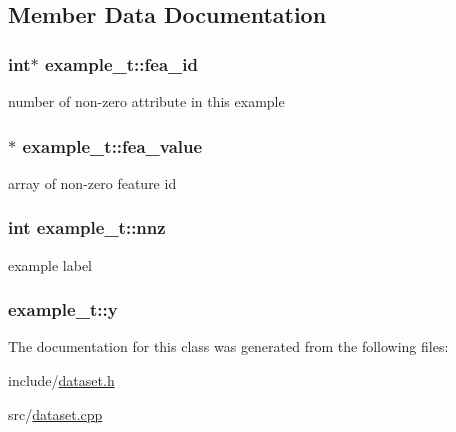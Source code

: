 \subsection{Member Data Documentation}
\hypertarget{classexample__t_a48940c5caff1e78969f1e2c2e7049532}{
\subsubsection[{fea\+\_\+id}]{\setlength{\rightskip}{0pt plus 5cm}int$\ast$ example\+\_\+t\+::fea\+\_\+id}}\label{classexample__t_a48940c5caff1e78969f1e2c2e7049532}
number of non-\/zero attribute in this example \hypertarget{classexample__t_acac894d54d087a9a5f27f063003d5b72}{
\subsubsection[{fea\+\_\+value}]{$\ast$ example\+\_\+t\+::fea\+\_\+value}}\label{classexample__t_acac894d54d087a9a5f27f063003d5b72}
array of non-\/zero feature id \hypertarget{classexample__t_a6501a26509c4d186310a5f51c7a9ddf8}{
\subsubsection[{nnz}]{\setlength{\rightskip}{0pt plus 5cm}int example\+\_\+t\+::nnz}}\label{classexample__t_a6501a26509c4d186310a5f51c7a9ddf8}
example label \hypertarget{classexample__t_a71bd4c6e68d5eb4543b84c47599e72bb}{
\subsubsection[{y}]{ example\+\_\+t\+::y}}\label{classexample__t_a71bd4c6e68d5eb4543b84c47599e72bb}


The documentation for this class was generated from the following files\+:\begin{DoxyCompactItemize}
\item 
include/\hyperlink{dataset_8h}{dataset.\+h}\item 
src/\hyperlink{dataset_8cpp}{dataset.\+cpp}\end{DoxyCompactItemize}
